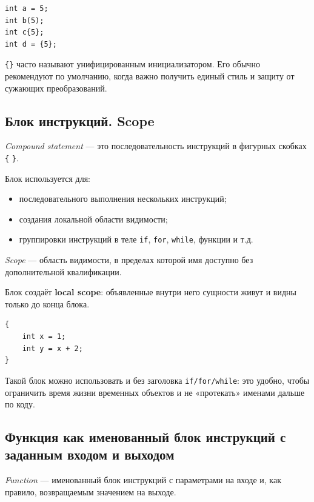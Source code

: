 \begin{example}
\begin{verbatim}
int a = 5;
int b(5);
int c{5};
int d = {5};
\end{verbatim}
\end{example}

\begin{remark}
\texttt{\{\}} часто называют унифицированным инициализатором. Его обычно рекомендуют по умолчанию, когда важно получить единый стиль и защиту от сужающих преобразований.
\end{remark}

\subsection{Блок инструкций. Scope}
\begin{definition}
\textit{Compound statement} — это последовательность инструкций в фигурных скобках \texttt{\{} \texttt{\}}.
\end{definition}

Блок используется для:
\begin{itemize}
    \item последовательного выполнения нескольких инструкций;
    \item создания локальной области видимости;
    \item группировки инструкций в теле \texttt{if}, \texttt{for}, \texttt{while}, функции и т.д.
\end{itemize}

\begin{definition}[Scope]
\textit{Scope} — область видимости, в пределах которой имя доступно без дополнительной квалификации.
\end{definition}

Блок создаёт \textbf{local scope}: объявленные внутри него сущности живут и видны только до конца блока.

\begin{example}
\begin{verbatim}
{
    int x = 1;
    int y = x + 2;
}
\end{verbatim}
\end{example}

Такой блок можно использовать и без заголовка \texttt{if/for/while}: это удобно, чтобы ограничить время жизни временных объектов и не «протекать» именами дальше по коду.

\subsection{Функция как именованный блок инструкций с заданным входом и выходом}
\begin{definition}[Функция]
\textit{Function} — именованный блок инструкций с параметрами на входе и, как правило, возвращаемым значением на выходе.
\end{definition}

